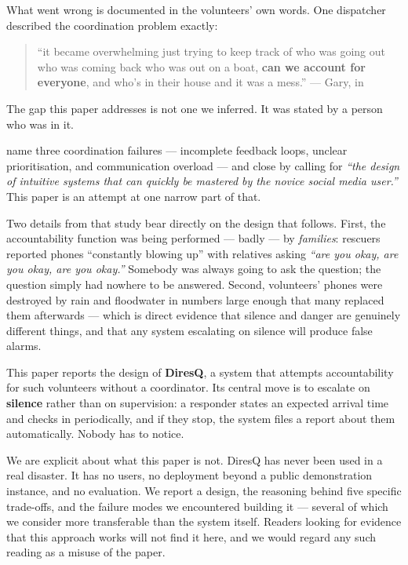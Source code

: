 What went wrong is documented in the volunteers' own words. One
dispatcher described the coordination problem exactly:

\begin{quote}
``it became overwhelming just trying to keep track of who was going out
who was coming back who was out on a boat, \textbf{can we account for
everyone}, and who's in their house and it was a mess.'' --- Gary, in
\citet{smith2018}
\end{quote}

The gap this paper addresses is not one we inferred. It was stated by a
person who was in it.

\citeauthor{smith2018} name three coordination failures --- incomplete feedback
loops, unclear prioritisation, and communication overload --- and close
by calling for \emph{``the design of intuitive systems that can quickly
be mastered by the novice social media user.''} This paper is an attempt
at one narrow part of that.

Two details from that study bear directly on the design that follows.
First, the accountability function was being performed --- badly --- by
\emph{families}: rescuers reported phones ``constantly blowing up'' with
relatives asking \emph{``are you okay, are you okay, are you okay.''}
Somebody was always going to ask the question; the question simply had
nowhere to be answered. Second, volunteers' phones were destroyed by
rain and floodwater in numbers large enough that many replaced them
afterwards --- which is direct evidence that silence and danger are
genuinely different things, and that any system escalating on silence
will produce false alarms.

This paper reports the design of \textbf{DiresQ}, a system that attempts
accountability for such volunteers without a coordinator. Its central
move is to escalate on \textbf{silence} rather than on supervision: a
responder states an expected arrival time and checks in periodically,
and if they stop, the system files a report about them automatically.
Nobody has to notice.

We are explicit about what this paper is not. DiresQ has never been used
in a real disaster. It has no users, no deployment beyond a public
demonstration instance, and no evaluation. We report a design, the
reasoning behind five specific trade-offs, and the failure modes we
encountered building it --- several of which we consider more
transferable than the system itself. Readers looking for evidence that
this approach works will not find it here, and we would regard any such
reading as a misuse of the paper.

